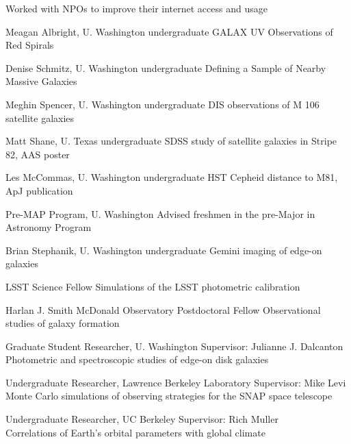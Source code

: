 \documentclass[10pt]{cv}
\begin{document}
\begin{llist}
Worked with NPOs to improve their internet access and usage


\employer{}Meagan Albright, U. Washington undergraduate
GALAX UV Observations of Red Spirals

\employer{}Denise Schmitz, U. Washington undergraduate
Defining a Sample of Nearby Massive Galaxies

\employer{}Meghin Spencer, U. Washington undergraduate
DIS observations of M 106 satellite galaxies

\employer{}Matt Shane, U. Texas undergraduate
SDSS study of satellite galaxies in Stripe 82, AAS poster

\employer{}Les McCommas, U. Washington undergraduate
HST Cepheid distance to M81, ApJ publication

\employer{}Pre-MAP Program, U. Washington
Advised freshmen in the pre-Major in Astronomy Program
 

\employer{}Brian Stephanik, U. Washington undergraduate
Gemini imaging of edge-on galaxies




{\sc LSST Science Fellow}
Simulations of the LSST photometric calibration 

{\sc Harlan J. Smith McDonald Observatory Postdoctoral Fellow}
Observational studies of galaxy formation

{\sc Graduate Student Researcher, U. Washington}
Supervisor: Julianne J. Dalcanton \\
Photometric and spectroscopic studies of edge-on disk galaxies

{\sc Undergraduate Researcher, Lawrence Berkeley Laboratory}
Supervisor: Mike Levi \\
Monte Carlo simulations of observing strategies for the SNAP space telescope

{\sc Undergraduate Researcher, UC Berkeley}
Supervisor: Rich Muller\\
Correlations of Earth's orbital parameters with global climate



\end{llist}
\end{document}
